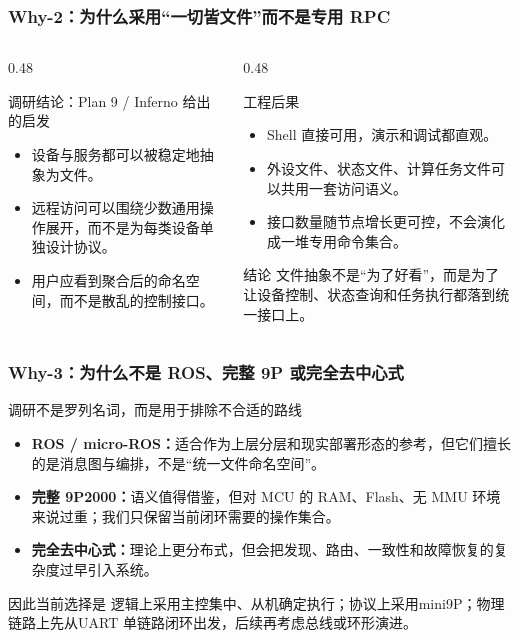 \documentclass[aspectratio=169]{ctexbeamer}
\begin{document}
\begin{frame}
  \frametitle{Why-2：为什么采用“一切皆文件”而不是专用 RPC}
  \begin{columns}[T]
    \begin{column}{0.48\textwidth}
      \begin{block}{调研结论：Plan 9 / Inferno 给出的启发}
        \small
        \begin{itemize}
          \item 设备与服务都可以被稳定地抽象为文件。
          \item 远程访问可以围绕少数通用操作展开，而不是为每类设备单独设计协议。
          \item 用户应看到聚合后的命名空间，而不是散乱的控制接口。
        \end{itemize}
      \end{block}
    \end{column}
    \begin{column}{0.48\textwidth}
      \begin{block}{工程后果}
        \small
        \begin{itemize}
          \item Shell 直接可用，演示和调试都直观。
          \item 外设文件、状态文件、计算任务文件可以共用一套访问语义。
          \item 接口数量随节点增长更可控，不会演化成一堆专用命令集合。
        \end{itemize}
      \end{block}
      \begin{alertblock}{结论}
        \small
        文件抽象不是“为了好看”，而是为了让\alert{设备控制、状态查询和任务执行}都落到统一接口上。
      \end{alertblock}
    \end{column}
  \end{columns}
\end{frame}

\begin{frame}
  \frametitle{Why-3：为什么不是 ROS、完整 9P 或完全去中心式}
  \begin{block}{调研不是罗列名词，而是用于排除不合适的路线}
    \small
    \begin{itemize}
      \item \textbf{ROS / micro-ROS：}适合作为上层分层和现实部署形态的参考，但它们擅长的是消息图与编排，不是“统一文件命名空间”。
      \item \textbf{完整 9P2000：}语义值得借鉴，但对 MCU 的 RAM、Flash、无 MMU 环境来说过重；我们只保留当前闭环需要的操作集合。
      \item \textbf{完全去中心式：}理论上更分布式，但会把发现、路由、一致性和故障恢复的复杂度过早引入系统。
    \end{itemize}
  \end{block}
  \pause
  \begin{alertblock}{因此当前选择是}
    \small
    逻辑上采用\alert{主控集中、从机确定执行}；协议上采用\alert{mini9P}；物理链路上先从\alert{UART 单链路闭环}出发，后续再考虑总线或环形演进。
  \end{alertblock}
\end{frame}
\end{document}
